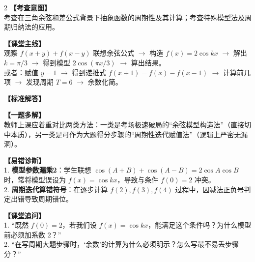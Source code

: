 \documentclass[12pt,a4paper]{ctexart}
\begin{document}
\vspace{0.8em}
\par{}
\vspace{0.8em}

\newpage

{\small
\qSixStem
}

\begin{paracol}{2}
  \textbf{【考查意图】}\\
  考查在三角余弦和差公式背景下抽象函数的周期性及其计算；考查特殊模型法及周期归纳法的应用。
  
  \textbf{【课堂主线】}\\
  观察 \(f(x+y)+f(x-y)\) 联想余弦公式 \(\to\) 构造 \(f(x)=2\cos kx\) \(\to\) 解出 \(k = \pi/3\) \(\to\) 得到模型 \(2\cos(\pi x/3)\) \(\to\) 算出结果。\\
  或者：赋值 \(y=1\) \(\to\) 得到递推式 \(f(x+1)=f(x)-f(x-1)\) \(\to\) 计算前几项 \(\to\) 发现周期 \(T=6\) \(\to\) 余数化简。
  
  \textbf{【标准解答】}\\
  \qSixSolution
  
  \textbf{【一题多解】}\\
  教师上课应着重对比两类方法：一类是考场极速破局的“余弦模型构造法”（直接切中本质），另一类是可作为大题得分步骤的“周期性迭代赋值法”（逻辑上严密无漏洞）。

  \switchcolumn
  \textbf{【易错诊断】}\\
  1. \textbf{模型参数漏乘2}：学生联想 \(\cos(A+B)+\cos(A-B)=2\cos A\cos B\) 时，常将模型误设为 \(f(x)=\cos kx\)，导致与条件 \(f(0)=2\) 冲突。\\
  2. \textbf{周期迭代算错符号}：在逐步计算 \(f(2), f(3), f(4)\) 过程中，因减法正负号判定出错导致周期错位。
  
  \textbf{【课堂追问】}\\
  1. “既然 \(f(0)=2\)，若我们设 \(f(x)=\cos kx\)，能满足这个条件吗？为什么模型前必须加系数 2？”\\
  2. “在写周期大题步骤时，‘余数’的计算为什么必须明示？怎么写最不易丢步骤分？”
\end{paracol}

\vspace{0.8em}
\par{}
\vspace{0.8em}

{\small
\qSevenStem
}
\end{document}
